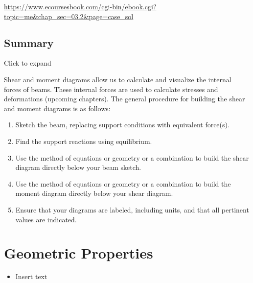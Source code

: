 \documentclass[
  letterpaper,
  DIV=11,
  numbers=noendperiod]{scrreprt}
\providecommand{\tightlist}{%
  \setlength{\itemsep}{0pt}\setlength{\parskip}{0pt}}\usepackage{longtable,booktabs,array}
\begin{document}
\url{https://www.ecoursesbook.com/cgi-bin/ebook.cgi?topic=me&chap_sec=03.2&page=case_sol}

\section*{Summary}\label{summary-3}


Click to expand

Shear and moment diagrams allow us to calculate and visualize the
internal forces of beams. These internal forces are used to calculate
stresses and deformations (upcoming chapters). The general procedure for
building the shear and moment diagrams is as follows:

\begin{enumerate}
\def\labelenumi{\arabic{enumi}.}
\tightlist
\item
  Sketch the beam, replacing support conditions with equivalent
  force(s).
\item
  Find the support reactions using equilibrium.
\item
  Use the method of equations or geometry or a combination to build the
  shear diagram directly below your beam sketch.
\item
  Use the method of equations or geometry or a combination to build the
  moment diagram directly below your shear diagram.
\item
  Ensure that your diagrams are labeled, including units, and that all
  pertinent values are indicated.
\end{enumerate}


\chapter{Geometric Properties}\label{sec-geometric-properties}

\begin{tcolorbox}[enhanced jigsaw, colbacktitle=quarto-callout-note-color!10!white, title={Learning Objectives}, coltitle=black, leftrule=.75mm, rightrule=.15mm, opacityback=0, breakable, colframe=quarto-callout-note-color-frame, left=2mm, arc=.35mm, colback=white, bottomrule=.15mm, bottomtitle=1mm, toptitle=1mm, titlerule=0mm, opacitybacktitle=0.6, toprule=.15mm]

\begin{itemize}
\tightlist
\item
  Insert text
\end{itemize}

\end{tcolorbox}
\end{document}
